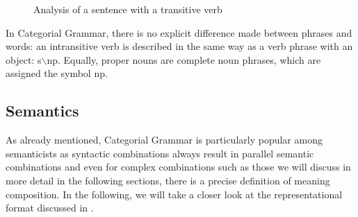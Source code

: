 \begin{figure}
\centerline{%
}
\caption{\label{abb-the-cat-chased-Mary}Analysis of a sentence with a transitive verb}
\end{figure}%

\noindent
In Categorial Grammar, there is no explicit difference made between phrases and words: an intransitive verb is described in the same way as a verb phrase with an
object:  s$\backslash$np. Equally, proper nouns are complete noun phrases, which are assigned the symbol np.\is{$\backslash$|)}

\subsection{Semantics}

\largerpage
As already mentioned, Categorial Grammar is particularly popular among semanticists as syntactic
combinations always result in parallel semantic combinations and even for complex combinations such
as those we will discuss in more detail in the following sections, there is a precise definition of
meaning composition.
In the following, we will take a closer look at the representational format discussed in \citet[Section~2.1.2]{Steedman97a}.

